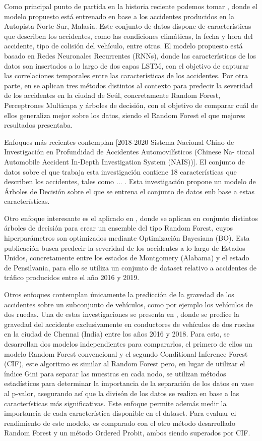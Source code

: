 \documentclass{uathesis-es}
\begin{document}
Como principal punto de partida en la historia reciente podemos tomar \cite{app7060476}, donde el modelo propuesto está entrenado en base a los accidentes producidos en la Autopista Norte-Sur, Malasia. Este conjunto de datos dispone de características que describen los accidentes, como las condiciones climáticas, la fecha y hora del accidente, tipo de colisión del vehículo, entre otras. El modelo propuesto está basado en Redes Neuronales Recurrentes (RNNs), donde las características de los datos son insertados a lo largo de dos capas LSTM, con el objetivo de capturar las correlaciones temporales entre las características de los accidentes. Por otra parte, en \cite{app10010129} se aplican tres métodos distintos al contexto para predecir la severidad de los accidentes en la ciudad de Seúl, concretamente Random Forest, Perceptrones Multicapa y árboles de decisión, con el objetivo de comparar cuál de ellos generaliza mejor sobre los datos, siendo el Random Forest el que mejores resultados presentaba.

Enfoques más recientes contemplan \cite{Yang2023} [2018-2020 Sistema Nacional Chino de Investigación en Profundidad de Accidentes Automovilísticos (Chinese Na- tional Automobile Accident In-Depth Investigation System (NAIS))]. El conjunto de datos sobre el que trabaja esta investigación contiene 18 características que describen los accidentes, tales como ... . Esta investigación propone un modelo de Árboles de Decisión sobre el que se entrena el conjunto de datos enb base a estas características.

Otro enfoque interesante es el aplicado en \cite{su14031729}, donde se aplican en conjunto distintos árboles de decisión para crear un ensemble del tipo Random Forest, cuyos hiperparámetros son optimizados mediante Optimización Bayesiana (BO). Esta publicación busca predecir la severidad de los accidentes a lo largo de Estados Unidos, concretamente entre los estados de Montgomery (Alabama) y el estado de Pensilvania, para ello se utiliza un conjunto de dataset relativo a accidentes de tráfico producidos entre el año 2016 y 2019.

Otros enfoques contemplan únicamente la predicción de la gravedad de los accidentes sobre un subconjunto de vehículos, como por ejemplo los vehículos de dos ruedas. Una de estas investigaciones se presenta en \cite{panicker2022injury}, donde se predice la gravedad del accidente exclusivamente en conductores de vehículos de dos ruedas en la ciudad de Chennai (India) entre los años 2016 y 2018. Para esto, se desarrollan dos modelos independientes para compararlos, el primero de ellos un modelo Random Forest convencional y  el segundo Conditional Inference Forest (CIF), este algoritmo es similar al Random Forest pero, en lugar de utilizar el índice Gini para separar las muestras en cada nodo, se utilizan métodos estadísticos para determinar la importancia de la separación de los datos en vase al p-valor, asegurando así que la divisón de los datos se realiza en base a las características más significativas. Este enfoque permite además medir la importancia de cada característica disponible en el dataset. Para evaluar el rendimiento de este modelo, es comparado con el otro método desarrollado Random Forest y un método Ordered Probit, ambos siendo superados por CIF.
\end{document}
